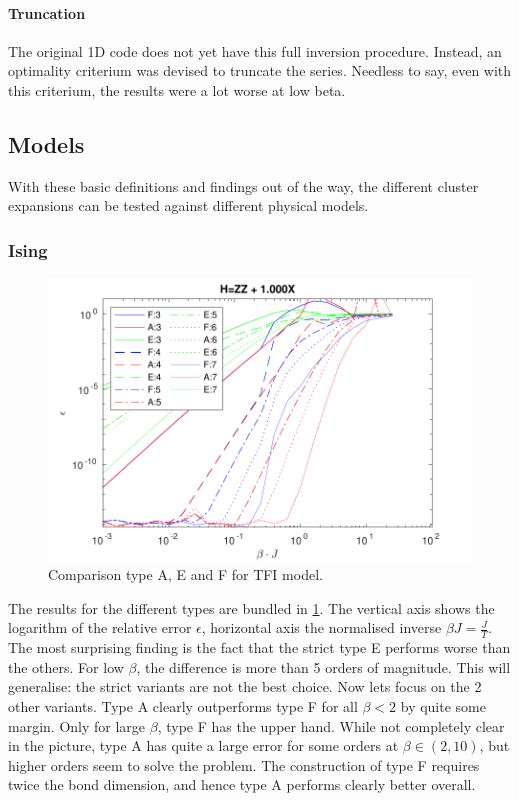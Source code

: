 \paragraph{Truncation}

The original 1D code does not yet have this full inversion procedure. Instead, an optimality criterium was devised to truncate the series. Needless to say, even with this criterium, the results were a lot worse at low beta.

\subsection{Models}

With these basic definitions and findings out of the way, the different cluster expansions can be tested against different physical models.

\subsubsection{Ising}

\begin{figure}[!htbp]
  \center
  \includegraphics[width=\textwidth]{Figuren/benchmarking/t_ising.pdf}
  \caption{Comparison type A, E and F for \Gls{TFI} model. }
  \label{fig:benchmark:tising}
\end{figure}

The results for the different types are bundled in \cref{fig:benchmark:tising}. The vertical axis shows the logarithm of the relative error $\epsilon$, horizontal axis the normalised inverse $\beta J = \frac{J}{T}$. The most surprising finding is the fact that the strict type E performs worse than the others. For low $\beta$, the difference is more than 5 orders of magnitude. This will generalise: the strict variants are not the best choice.
Now lets focus on the 2 other variants. Type A clearly outperforms type F for all $\beta<2$ by quite some margin. Only for large $\beta$, type F has the upper hand. While not completely clear in the picture, type A has quite a large error for some orders at $\beta \in (2,10) $, but higher orders seem to solve the problem. The construction of type F requires twice the bond dimension, and hence type A performs clearly better overall.

